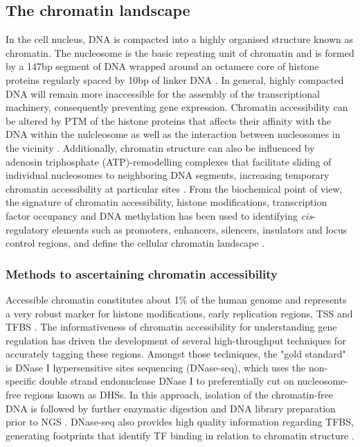 \subsection{The chromatin landscape}
In the cell nucleus, DNA is compacted into a highly organised structure known as chromatin. The nucleosome is the basic repeating unit of chromatin and is formed by a 147bp segment of DNA wrapped around an octamere core of histone proteins regularly spaced by 10bp of linker DNA \parencite{Luger1997}. In general, highly compacted DNA will remain more inaccessible for the assembly of the transcriptional machinery, consequently preventing gene expression. Chromatin accessibility can be altered by PTM of the histone proteins that affects their affinity with the DNA within the nulcleosome as well as the interaction between nucleosomes in the vicinity \parencite{Polach2000,Pepenella2014}. Additionally, chromatin structure can also be influenced by adenosin triphosphate (ATP)-remodelling complexes that facilitate sliding of individual nucleosomes to neighboring DNA segments, increasing temporary chromatin accessibility at particular sites \parencite{Cosma1999}. From the biochemical point of view, the signature of chromatin accessibility, histone modifications, transcription factor occupancy and DNA methylation has been used to identifying \textit{cis}-regulatory elements such as promoters, enhancers, silencers, insulators and locus control regions, and define the cellular chromatin landscape \parencite{Boyle2012,Kundaje2015}.



\subsubsection{Methods to ascertaining chromatin accessibility}

Accessible chromatin constitutes about 1\% of the human genome and represents a very robust marker for histone modifications, early replication regions, TSS and TFBS \parencite{ENCODE2007}. The informativeness of chromatin accessibility for understanding gene regulation has driven the development of several high-throughput techniques for accurately tagging these regions. Amongst those techniques, the "gold standard" is DNase I hypersensitive sites sequencing (DNase-seq), which uses the non-specific double strand endonuclease DNase I to preferentially cut on nucleosome-free regions known as DHSs. In this approach, isolation of the chromatin-free DNA is followed by further enzymatic digestion and DNA library preparation prior to NGS \parencite{John2013}. DNase-seq also provides high quality information regarding TFBS, generating footprints that identify TF binding in relation to chromatin structure \parencite{Hesselberth2009,Boyle2010}. 

